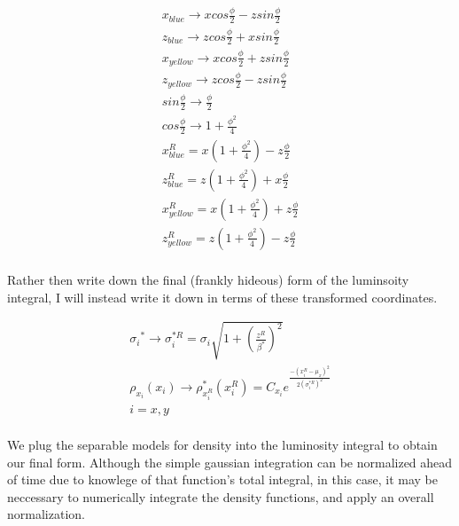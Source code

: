 \begin{gather}
\label{eq:transformations}
x_{blue}   \rightarrow x cos \frac{\phi}{2} - z sin \frac{\phi}{2} \\
z_{blue}   \rightarrow z cos \frac{\phi}{2} + x sin \frac{\phi}{2} \\
x_{yellow} \rightarrow x cos \frac{\phi}{2} + z sin \frac{\phi}{2} \\
z_{yellow} \rightarrow z cos \frac{\phi}{2} - z sin \frac{\phi}{2} \\
sin \frac {\phi}{2} \rightarrow \frac{\phi}{2} \\
cos \frac {\phi}{2} \rightarrow 1 + \frac{\phi^2}{4} \\
x_{blue}^{R}  = x\left(1+\frac{{\phi}^{2}}{4}\right)- z \frac{\phi}{2} \\
z_{blue}^{R}  = z\left(1+\frac{{\phi}^{2}}{4}\right)+ x \frac{\phi}{2} \\
x_{yellow}^{R}= x\left(1+\frac{{\phi}^{2}}{4}\right)+ z \frac{\phi}{2} \\
z_{yellow}^{R}= z\left(1+\frac{{\phi}^{2}}{4}\right)- z \frac{\phi}{2} \\
\end{gather}

Rather then write down the final (frankly hideous) form of the luminsoity
integral, I will instead write it down in terms of these transformed
coordinates.

\begin{gather}
\label{eq:final_luminosity}
{{\sigma}_{i}}^{*} \rightarrow \sigma_{i}^{*R} =
\sigma_{i}\sqrt{1+{\left(\frac{z^{R}}{\beta^{*}} \right)}^{2} } \\
\rho_{x_i}(x_{i}) \rightarrow \rho_{x_{i}^{R}}^{*}(x_{i}^{R}) = C_{x_{i}}{e}^{\frac{-{\left(x_{i}^{R}-\mu_{x}\right)}^2}{2{\left(\sigma_{i}^{*R}\right)}^2}} \\
i = x,y \\
\end{gather}

We plug the separable models for density into the luminosity integral to obtain
our final form. Although the simple gaussian integration can be normalized
ahead of time due to knowlege of that function's total integral, in this case,
it may be neccessary to numerically integrate the density functions, and apply
an overall normalization.

\clearpage


\clearpage



